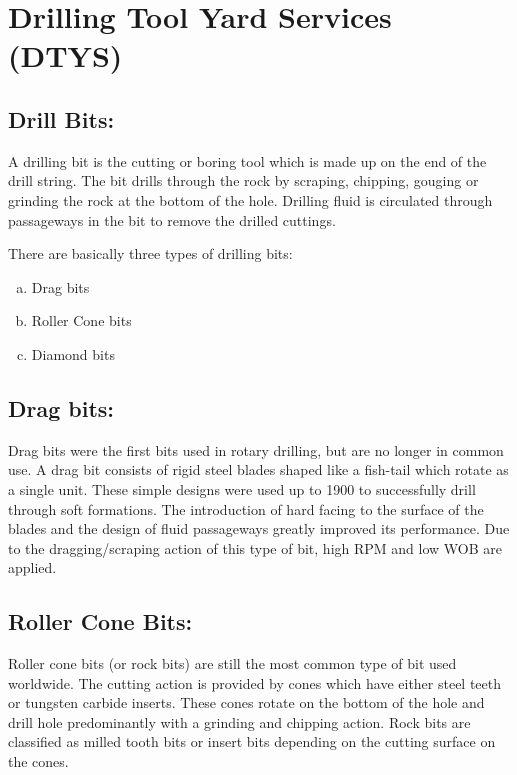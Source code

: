 \chapter{Drilling Tool Yard Services (DTYS)}

\section*{\textbf{Drill Bits:} }
A drilling bit is the cutting or boring tool which is made
up on the end of the drill string. The bit drills through the rock by
scraping, chipping, gouging or grinding the rock at the bottom of the
hole. Drilling fluid is circulated through passageways in the bit to
remove the drilled cuttings.


There are basically three types of drilling bits:

\begin{enumerate}[(a)]
\item Drag bits
\item Roller Cone bits
\item Diamond bits

\end{enumerate}

\section*{Drag bits:} 

Drag bits were the first bits used in rotary drilling, but are
no longer in common use. A drag bit consists of rigid steel blades
shaped like a fish-tail which rotate as a single unit. These simple
designs were used up to 1900 to successfully drill through soft
formations. The introduction of hard facing to the surface of the
blades and the design of fluid passageways greatly improved its
performance. Due to the dragging/scraping action of this type of bit,
high RPM and low WOB are applied.


\section*{\textbf{Roller Cone Bits:}}

Roller cone bits (or rock bits) are still the most
common type of bit used worldwide. The cutting action is provided
by cones which have either steel teeth or tungsten carbide inserts.
These cones rotate on the bottom of the hole and drill hole
predominantly with a grinding and chipping action.
Rock bits are classified as milled tooth bits or insert bits depending
on the cutting surface on the cones.

